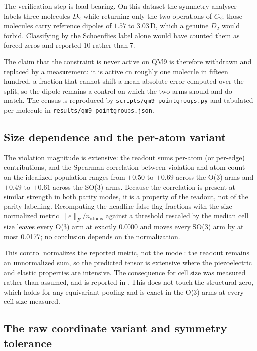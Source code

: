 The verification step is load-bearing. On this dataset the symmetry analyser labels three molecules $D_2$ while returning only the two operations of $C_2$; those molecules carry reference dipoles of $1.57$ to $3.03$\,D, which a genuine $D_2$ would forbid. Classifying by the Schoenflies label alone would have counted them as forced zeros and reported 10 rather than 7.

The claim that the constraint is never active on QM9 is therefore withdrawn and replaced by a measurement: it is active on roughly one molecule in fifteen hundred, a fraction that cannot shift a mean absolute error computed over the split, so the dipole remains a control on which the two arms should and do match. The census is reproduced by \texttt{scripts/qm9\_pointgroups.py} and tabulated per molecule in \texttt{results/qm9\_pointgroups.json}.

\subsection*{Size dependence and the per-atom variant}

The violation magnitude is extensive: the readout sums per-atom (or per-edge) contributions, and the Spearman correlation between violation and atom count on the idealized population ranges from $+0.50$ to $+0.69$ across the O(3) arms and $+0.49$ to $+0.61$ across the SO(3) arms. Because the correlation is present at similar strength in both parity modes, it is a property of the readout, not of the parity labelling. Recomputing the headline false-flag fractions with the size-normalized metric $\lVert e \rVert_F / n_{\mathrm{atoms}}$ against a threshold rescaled by the median cell size leaves every O(3) arm at exactly 0.0000 and moves every SO(3) arm by at most 0.0177; no conclusion depends on the normalization.

This control normalizes the reported metric, not the model: the readout remains an unnormalized sum, so the predicted tensor is extensive where the piezoelectric and elastic properties are intensive. The consequence for cell size was measured rather than assumed, and is reported in . This does not touch the structural zero, which holds for any equivariant pooling and is exact in the O(3) arms at every cell size measured.


\subsection*{The raw coordinate variant and symmetry tolerance}\label{snote:rawvariant}

